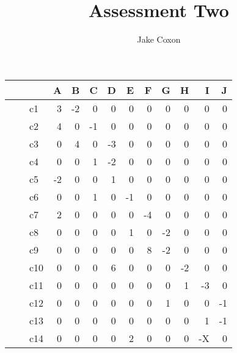 \documentclass{article}
\begin{document}
\title{Assessment Two}
\author{Jake Coxon}
\maketitle

\section{}
\subsection{}

\begin{table}[H]
  \centering
  \begin{tabular}{|l|rrrrrrrrrr|}
    \hline
    ~   & A  & B  & C  & D  & E  & F  & G  & H  & I  & J  \\ \hline
    c1  &  3 & -2 &  0 &  0 &  0 &  0 &  0 &  0 &  0 &  0 \\ 
    c2  &  4 &  0 & -1 &  0 &  0 &  0 &  0 &  0 &  0 &  0 \\ 
    c3  &  0 &  4 &  0 & -3 &  0 &  0 &  0 &  0 &  0 &  0 \\ 
    c4  &  0 &  0 &  1 & -2 &  0 &  0 &  0 &  0 &  0 &  0 \\ 
    c5  & -2 &  0 &  0 &  1 &  0 &  0 &  0 &  0 &  0 &  0 \\ 
    c6  &  0 &  0 &  1 &  0 & -1 &  0 &  0 &  0 &  0 &  0 \\ 
    c7  &  2 &  0 &  0 &  0 &  0 & -4 &  0 &  0 &  0 &  0 \\ 
    c8  &  0 &  0 &  0 &  0 &  1 &  0 & -2 &  0 &  0 &  0 \\ 
    c9  &  0 &  0 &  0 &  0 &  0 &  8 & -2 &  0 &  0 &  0 \\ 
    c10 &  0 &  0 &  0 &  6 &  0 &  0 &  0 & -2 &  0 &  0 \\ 
    c11 &  0 &  0 &  0 &  0 &  0 &  0 &  0 &  1 & -3 &  0 \\ 
    c12 &  0 &  0 &  0 &  0 &  0 &  0 &  1 &  0 &  0 & -1 \\ 
    c13 &  0 &  0 &  0 &  0 &  0 &  0 &  0 &  0 &  1 & -1 \\ 
    c14 &  0 &  0 &  0 &  0 &  2 &  0 &  0 &  0 & -X &  0\\ \hline
\end{tabular}
\end{table}
\end{document}
